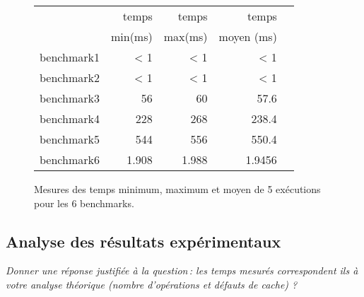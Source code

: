 \documentclass[a4paper, 10pt, french]{article}
\begin{document}
    \begin{figure}[h]
      \begin{center}
        \begin{tabular}{|l||r||r|r|r||}
          \hline
          \hline
            & temps     & temps   & temps     \\
            & min(ms)  & max(ms)  & moyen (ms)\\
          \hline
          \hline
            benchmark1 & < 1 & < 1 & < 1 \\
          \hline
            benchmark2 & < 1 & < 1 & < 1 \\
          \hline
            benchmark3 & 56 & 60 & 57.6 \\
          \hline
            benchmark4 & 228 & 268 & 238.4 \\
          \hline
            benchmark5 & 544 & 556 & 550.4 \\
          \hline
            benchmark6 & 1.908 & 1.988 & 1.9456 \\
          \hline
          \hline
        \end{tabular}
        \caption{Mesures des temps minimum, maximum et moyen de 5 exécutions pour les 6 benchmarks.}
        \label{table-temps}
      \end{center}
    \end{figure}

\subsection{Analyse des résultats expérimentaux}
{\em Donner  une réponse justifiée  à la question\,: 
              les  temps mesurés correspondent ils  à votre analyse théorique (nombre d’opérations et défauts de cache) ?
}
\end{document}
